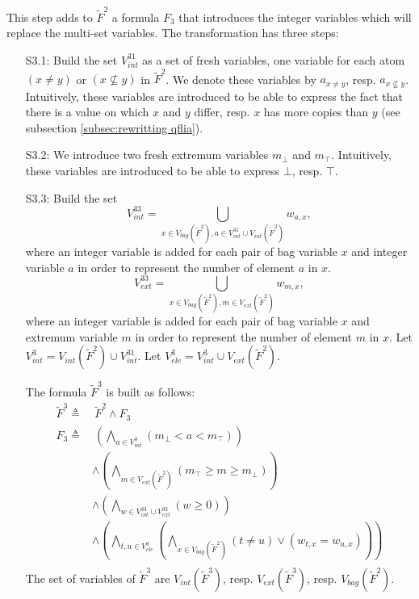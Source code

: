 This step adds to $\tilde{F}^2$ a formula $F_3$ that introduces the integer variables which will replace the multi-set variables. The transformation has three steps:

\begin{enumerate}
\item[S3.1:] Build the set $V^{31}_{int}$ as a set of fresh variables, one variable for each atom $(x \neq y)$ or $(x \nsubseteq y)$ in $\tilde{F}^2$.
We denote these variables by $a_{x \neq y}$, resp. $a_{x \nsubseteq y}$.
Intuitively, these variables are introduced to be able to express the fact that there is a value on which $x$ and $y$ differ, resp. $x$ has more copies than $y$ (see subsection \ref{subsec:rewritting qflia}).

\item[S3.2:] We introduce two fresh extremum variables $m_{\bot}$ and $m_{\top}$.
Intuitively, these variables are introduced to be able to express $\bot$, resp. $\top$.

\item[S3.3:] Build the set
$$V^{33}_{int}  =
\bigcup_{x\in V_{bag}(\tilde{F}^2), a\in  V^{31}_{int}\cup V_{int}(\tilde{F}^2)} w_{a,x},$$
where an integer variable is added for each pair of bag variable $x$ and integer variable $a$ in order to represent the number of element $a$ in $x$.
$$V^{33}_{ext}  =
\bigcup_{x\in V_{bag}(\tilde{F}^2), m\in  V_{ext}(\tilde{F}^2)} w_{m,x},$$
where an integer variable is added for each pair of bag variable $x$ and extremum variable $m$ in order to represent the number of element $m$ in $x$.
Let $V^3_{int} = V_{int}(\tilde{F}^2) \cup V^{31}_{int}$.
Let $V^3_{ele} = V^3_{int} \cup V_{ext}(\tilde{F}^2)$.

The formula $\tilde{F}^3$ is built as follows:
\begin{align}
  \tilde{F}^3 \triangleq &\
  \tilde{F}^2 \land F_{3} \\
  F_{3 } \triangleq &\
  \left(\bigwedge_{a \in V^{3}_{int}}(m_{\bot} < a < m_{\top})\right)
  \\
  & \land
  \left(\bigwedge_{m \in V_{ext}(\tilde{F}^2)}(m_{\top} \ge m \ge m_{\bot})\right)
  \\
  & \land
  \left(\bigwedge_{w \in V^{33}_{int}\cup V^{33}_{ext}}(w \ge 0)\right)
  \\
  & \land
  \left(\bigwedge_{t,u \in V^3_{ele}}\left(\bigwedge_{x\in V_{bag}(\tilde{F}^2)}(t \neq u) \lor (w_{t,x} = w_{u,x})\right)\right)
  \\
\end{align}
The set of variables of $\tilde{F}^3$ are $V_{int}(\tilde{F}^3)$, resp. $V_{ext}(\tilde{F}^3)$, resp. $V_{bag}(\tilde{F}^2)$.
\end{enumerate}

